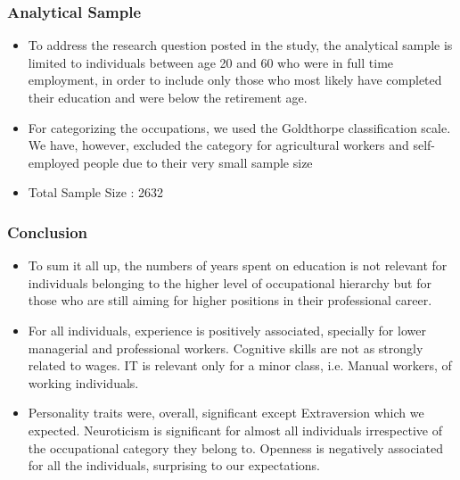 \documentclass[11pt]{beamer}
\begin{document}
\begin{frame}[t]
	\frametitle{Analytical Sample}
	 \begin{itemize}
	 	\item To address the research question posted in the study, the analytical
sample is limited to individuals between age 20 and 60 who were in
full time employment, in order to include only those who most likely
have completed their education and were below the retirement age.

		\item For categorizing the occupations, we used the Goldthorpe
classification scale. We have, however, excluded the category for
agricultural workers and self-employed people due to their very small
sample size

		\item Total Sample Size : 2632
	\end{itemize}
\end{frame}

\begin{frame}[t]
	\frametitle{Conclusion}
	 \begin{itemize}
		\item To sum it all up, the numbers of years spent on education is not relevant
for individuals belonging to the higher level of occupational hierarchy but
for those who are still aiming for higher positions in their professional
career.

		\item For all individuals, experience is positively associated, specially for lower
managerial and professional workers. Cognitive skills are not as strongly
related to wages. IT is relevant only for a minor class, i.e. Manual workers,
of working individuals.

		\item Personality traits were, overall, significant except Extraversion which we
expected. Neuroticism is significant for almost all individuals irrespective of
the occupational category they belong to. Openness is negatively
associated for all the individuals, surprising to our expectations.
	\end{itemize}
\end{frame}
\end{document}

